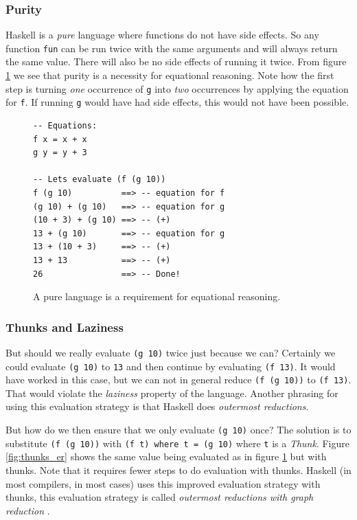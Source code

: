 \subsubsection{Purity}

Haskell is a \emph{pure} language where functions do not have side
effects. So any function \texttt{fun} can be run twice with the same
arguments and will always return the same value. There will also be no
side effects of running it twice. From figure \ref{fig:purity_er} we
see that purity is a necessity for equational reasoning. Note how the
first step is turning \emph{one} occurrence of \texttt{g} into \emph{two}
occurrences by applying the equation for \texttt{f}. If running \texttt{g}
would have had side effects, this would not have been possible.

\begin{figure}
\begin{mdframed}
  \begin{verbatim}
-- Equations:
f x = x + x
g y = y + 3

-- Lets evaluate (f (g 10))
f (g 10)          ==> -- equation for f
(g 10) + (g 10)   ==> -- equation for g
(10 + 3) + (g 10) ==> -- (+)
13 + (g 10)       ==> -- equation for g
13 + (10 + 3)     ==> -- (+)
13 + 13           ==> -- (+)
26                ==> -- Done!
  \end{verbatim}
  \caption{A pure language is a requirement for equational reasoning.}
  \label{fig:purity_er}
\end{mdframed}
\end{figure}

\subsubsection{Thunks and Laziness}

But should we really evaluate \texttt{(g 10)} twice just because we can?
Certainly we could evaluate \texttt{(g 10)} to \texttt{13} and then 
continue by evaluating \texttt{(f 13)}.  It would have worked in this
case, but we can not
in general reduce \texttt{(f (g 10))} to \texttt{(f 13)}. That would
violate the \emph{laziness} property of the language.  Another phrasing for
using this evaluation strategy is that Haskell does \emph{outermost reductions}.

But how do we then ensure that we only evaluate \texttt{(g 10)} once?
The solution is to substitute \texttt{(f (g 10))} with \texttt{(f
t) where t = (g 10)} where \texttt{t} is a \emph{Thunk}. Figure
\ref{fig:thunks_er} shows the same value being evaluated as in figure
\ref{fig:purity_er} but with thunks. Note that it requires fewer steps
to do evaluation with thunks. Haskell (in most compilers, in most cases)
uses this improved evaluation strategy with thunks, this evaluation
strategy is called \emph{outermost reductions with graph reduction}
\cite{wikibooks_graph_reduction}.

